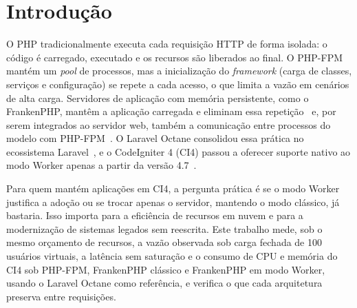 \documentclass[sigconf, nonacm, screen, anonymous, language=portuguese, language=spanish, language={main=english}]{acmart}
\begin{document}
\maketitle
{}
\section{Introdução}
O PHP tradicionalmente executa cada requisição HTTP de forma isolada: o código é carregado, executado e os recursos são liberados ao final. O PHP-FPM mantém um \textit{pool} de processos, mas a inicialização do \textit{framework} (carga de classes, serviços e configuração) se repete a cada acesso, o que limita a vazão em cenários de alta carga. Servidores de aplicação com memória persistente, como o FrankenPHP, mantêm a aplicação carregada e eliminam essa repetição~\cite{dungalas2024} e, por serem integrados ao servidor web, também a comunicação entre processos do modelo com PHP-FPM~\cite{dhaniswara2025}. O Laravel Octane consolidou essa prática no ecossistema Laravel~\cite{otwell2024}, e o CodeIgniter 4 (CI4) passou a oferecer suporte nativo ao modo Worker apenas a partir da versão 4.7~\cite{codeigniter2024}.

Para quem mantém aplicações em CI4, a pergunta prática é se o modo Worker justifica a adoção ou se trocar apenas o servidor, mantendo o modo clássico, já bastaria. Isso importa para a eficiência de recursos em nuvem e para a modernização de sistemas legados sem reescrita. Este trabalho mede, sob o mesmo orçamento de recursos, a vazão observada sob carga fechada de 100 usuários virtuais, a latência sem saturação e o consumo de CPU e memória do CI4 sob PHP-FPM, FrankenPHP clássico e FrankenPHP em modo Worker, usando o Laravel Octane como referência, e verifica o que cada arquitetura preserva entre requisições.
\end{document}
